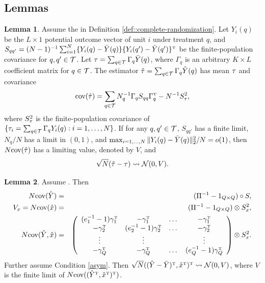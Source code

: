 \documentclass[11pt]{article}
\theoremstyle{definition}
\newtheorem{lemma}{Lemma}
\begin{document}
\subsection{Lemmas}\label{sec:yb_app_lemma}
\begin{lemma}\citep[][Theorems 3 and 5]{DingCLT}\label{lem:Ding17}
Assume the {\cre} in Definition \ref{def::complete-randomization}. 
Let $Y_i(q)$ be the $L\times 1$ potential outcome vector of unit $i$ under treatment $q$, and $S_{qq'} = (N-1)^{-1} \sum_{i=1}^N \{Y_i(q) - \bar Y(q)\}\{Y_i(q') - \bar Y(q')\}^{ \mathrm{\scriptscriptstyle T} }$ be the finite-population covariance for $q, q'\in \mathcal{T}$. 
Let $\tau =  \sum_{q \in\mathcal{T}}   \Gamma_q \bar Y(q)$, where $\Gamma_q$ is an  arbitrary $K\times L$ coefficient matrix for $q\in \mathcal{T}$. 
The estimator $\hat{\tau} =  \sum_{q \in\mathcal{T}}   \Gamma_q \hat Y(q)$ has mean $\tau$ and covariance 
$$\text{cov}(\hat{\tau}) = \sum_{q \in\mathcal{T}} N_q^{-1}  \Gamma_q  S_{qq}  \Gamma_q^{ \mathrm{\scriptscriptstyle T} } - N^{-1}  S_{\tau}^2,$$
where $S_{\tau}^2$ is the finite-population covariance of $\{\tau_i =  \sum_{q \in\mathcal{T}}   \Gamma_q Y_i(q): i=1, \ldots,N\}$.
If for any $q, q' \in \mathcal{T}$, $S_{qq'}$ has a finite limit, $N_q/N$ has a limit in $(0,1)$, and $\max_{i = 1, \ldots,N} \|Y_i(q)-\bar Y(q)\|^2_2 /N =o(1)$, then 
$N\text{cov}(\hat{\tau})$ has a limiting value, denoted by $ V$, and 
$$\sqrt N(\hat{\tau}  - \tau) \rightsquigarrow \mathcal{N}( 0,  V).$$
\end{lemma}

\begin{lemma}\label{lem:cov_xy}
Assume \cre.  
Then  
\begin{eqnarray*}
N\text{cov}(\hat Y) &=&    (\Pi^{-1}-1_{Q\times Q}) \circ  S, \\
V_x = N\text{cov}(\hat x) &=&  (\Pi^{-1}-1_{Q\times Q})  \otimes  S^2_{x},\\
N\text{cov}(\hat Y, \hat x) 
&=& 
 \left(
 \begin{array}{cccc}
 (e_1 ^{-1}-1)\gamma_1^{ \mathrm{\scriptscriptstyle T} } & -\gamma_1^{ \mathrm{\scriptscriptstyle T} } & \dots & - \gamma_1^{ \mathrm{\scriptscriptstyle T} } \\
 - \gamma_2^{ \mathrm{\scriptscriptstyle T} } & (e_2 ^{-1}-1)\gamma_2^{ \mathrm{\scriptscriptstyle T} } & \dots & - \gamma_2^{ \mathrm{\scriptscriptstyle T} }\\
 \vdots & \vdots &&\vdots\\
 - \gamma_Q^{ \mathrm{\scriptscriptstyle T} } & -\gamma_Q^{ \mathrm{\scriptscriptstyle T} } & \dots &  (e_Q ^{-1}-1)\gamma_Q^{ \mathrm{\scriptscriptstyle T} }
 \end{array}
 \right) \otimes S^2_{x}  .
\end{eqnarray*}
Further assume Condition \ref{asym}. Then 
$\sqrt N( (\hat Y - \bar Y)^{ \mathrm{\scriptscriptstyle T} }, \hat x^{ \mathrm{\scriptscriptstyle T} })^{ \mathrm{\scriptscriptstyle T} } \rightsquigarrow \mathcal{N}(0, V)$, where $V$ is the finite limit of $ N\text{cov}( (\hat Y^{ \mathrm{\scriptscriptstyle T} }, \hat x^{ \mathrm{\scriptscriptstyle T} })^{ \mathrm{\scriptscriptstyle T} })$. 
\end{lemma}

\end{document}
